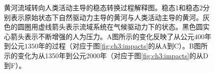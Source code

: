 \begin{figure}[!ht] %
    \caption[历史时期黄河流域水沙特征由人类活动主导的过程]{黄河流域转向人类活动主导的稳态转换过程解释图。稳态1和稳态2分别表示原始状态下自然驱动力主导的黄河与人类活动主导的黄河。灰色的圆圈用虚线箭头表示流域系统在气候驱动力下的状态。黑色圆实心箭头表示不断增强的人为压力。A图所示的变化反映了从公元$400$年到公元$1350$年的过程（对应于图\ref{fig:ch3:impacts}的从A到C）。B图所示的变化为从1350年到公元2000年（对应于图\ref{fig:ch3:impacts}的从D到F）。}\label{fig:ch3:regime_shift}
\end{figure}
